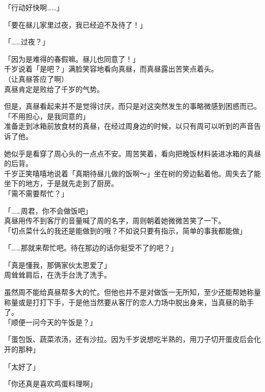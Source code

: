 「行动好快啊……」

「要在昼儿家里过夜，我已经迫不及待了！」

「……过夜？」

「因为是难得的春假嘛。昼儿也同意了！」\\

千岁说着「是吧？」满脸笑容地看向真昼，而真昼露出苦笑点着头。\\

（让真昼答应了啊）\\

真昼肯定是败给了千岁的气势。

但是，真昼看起来并不是觉得讨厌，而只是对这突然发生的事略微感到困惑而已。\\

「不用担心，是我同意的」\\

准备走到冰箱前放食材的真昼，在经过周身边的时候，以只有周可以听到的声音告诉了他。

她似乎是看穿了周心头的一点点不安。周苦笑着，看向把晚饭材料装进冰箱的真昼的后背。\\

千岁正笑嘻嘻地说着「真期待昼儿做的饭啊～」坐在树的旁边黏着他。周失去了能坐下的地方，于是就先走到了厨房。\\

「需不需要帮忙？」

「……周君，你不会做饭吧」\\

真昼用传不到客厅的音量喊了周的名字，周则朝着她微微苦笑了一下。\\

「切点菜什么的我还是能做到的哦？不如说只要有指示，简单的事我都能做」

「……那就来帮忙吧。待在那边的话你挺受不了的吧？」

「真是懂我，那俩家伙太恩爱了」\\

周耸耸肩后，在洗手台洗了洗手。

虽然周不能给真昼帮多大的忙。但他也并不是对做饭一无所知，至少还能帮她称量称量或是打打下手，于是他当然要从客厅的恋人力场中脱出身来，当真昼的助手了。\\

「顺便一问今天的午饭是？」

「蛋包饭、蔬菜浓汤，还有沙拉。因为千岁说想吃半熟的，用刀子切开蛋皮后会化开的那种」

「太好了」

「你还真是喜欢鸡蛋料理啊」

